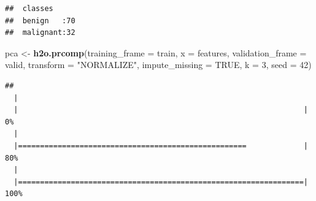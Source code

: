 \documentclass[]{article}
\newenvironment{Shaded}{\begin{snugshade}}{\end{snugshade}}
\newcommand{\KeywordTok}[1]{\textcolor[rgb]{0.13,0.29,0.53}{\textbf{{#1}}}}
\newcommand{\DataTypeTok}[1]{\textcolor[rgb]{0.13,0.29,0.53}{{#1}}}
\newcommand{\DecValTok}[1]{\textcolor[rgb]{0.00,0.00,0.81}{{#1}}}
\newcommand{\FloatTok}[1]{\textcolor[rgb]{0.00,0.00,0.81}{{#1}}}
\newcommand{\StringTok}[1]{\textcolor[rgb]{0.31,0.60,0.02}{{#1}}}
\newcommand{\OtherTok}[1]{\textcolor[rgb]{0.56,0.35,0.01}{{#1}}}
\newcommand{\NormalTok}[1]{{#1}}
\begin{document}
\begin{verbatim}
##  classes      
##  benign   :70 
##  malignant:32
\end{verbatim}

\begin{Shaded}
\begin{Highlighting}[]
\NormalTok{pca <-}\StringTok{ }\KeywordTok{h2o.prcomp}\NormalTok{(}\DataTypeTok{training_frame =} \NormalTok{train,}
           \DataTypeTok{x =} \NormalTok{features,}
           \DataTypeTok{validation_frame =} \NormalTok{valid,}
           \DataTypeTok{transform =} \StringTok{"NORMALIZE"}\NormalTok{,}
           \DataTypeTok{impute_missing =} \OtherTok{TRUE}\NormalTok{,}
           \DataTypeTok{k =} \DecValTok{3}\NormalTok{,}
           \DataTypeTok{seed =} \DecValTok{42}\NormalTok{)}
\end{Highlighting}
\end{Shaded}

\begin{verbatim}
## 
  |                                                                       
  |                                                                 |   0%
  |                                                                       
  |====================================================             |  80%
  |                                                                       
  |=================================================================| 100%
\end{verbatim}

\begin{Shaded}
\end{Shaded}
\end{document}
